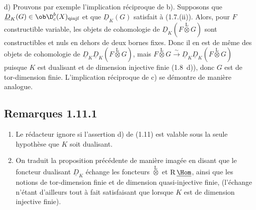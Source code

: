 d)
Prouvons par exemple l'implication réciproque de b). Supposons que $\underline{D}_K(G) \in \ob \D_c^{b}(X)_{\mathrm{qinjf}}$ et que $\underline{D}_K(G)$ satisfait à (1.7.(ii)). Alors, pour $F$ constructible variable, les objets de cohomologie de $\underline{D}_K(F \mathop{\otimes}\limits^{\mathrm{L}} G)$ sont constructibles et nuls en dehors de deux bornes fixes. Donc il en est de même des objets de cohomologie de $\underline{D}_K \underline{D}_K(F \mathop{\otimes}\limits^{\mathrm{L}} G)$, mais $F \mathop{\otimes}\limits^{\mathrm{L}} G \xrightarrow{\sim} \underline{D}_K \underline{D}_K(F \mathop{\otimes}\limits^{\mathrm{L}} G)$ puisque $K$ est dualisant et de dimension injective finie (1.8~d)), donc $G$ est de tor-dimension finie. L'implication réciproque de c) se démontre de manière analogue.

\subsection*{Remarques 1.11.1}
\begin{enumerate}
\item[a)] Le rédacteur ignore si l'assertion d) de (1.11) est valable sous la seule hypothèse que $K$ soit dualisant.
\item[b)] On traduit la proposition précédente de manière imagée en disant que le foncteur dualisant $\underline{D}_K$ échange les foncteurs $\mathop{\otimes}\limits^{\mathrm{L}}$ et $\mathrm{R}\,\underline{\Hom}$, ainsi que les notions de tor-dimension finie et de dimension quasi-injective finie, (l'échange n'étant d'ailleurs tout à fait satisfaisant que lorsque $K$ est de dimension injective finie).
\end{enumerate}

